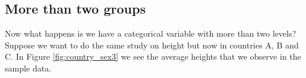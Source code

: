 \documentclass[]{report}\usepackage[]{graphicx}\usepackage[]{color}
\begin{document}






\subsection{More than two groups}

Now what happens is we have a categorical variable with more than two levels? Suppose we want to do the same study on height but now in countries A, B and C. In Figure \ref{fig:country_sex3} we see the average heights that we observe in the sample data.
\end{document}
